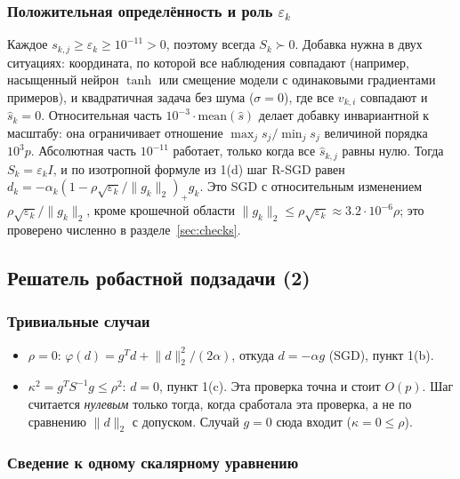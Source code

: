 \documentclass[11pt,a4paper]{article}
\newcommand{\norm}[1]{\lVert #1\rVert_2}
\begin{document}
\subsubsection*{Положительная определённость и роль $\varepsilon_k$}

Каждое $s_{k,j}\ge\varepsilon_k\ge10^{-11}>0$, поэтому всегда $S_k\succ0$. Добавка
нужна в двух ситуациях: координата, по которой все наблюдения совпадают (например,
насыщенный нейрон $\tanh$ или смещение модели с одинаковыми градиентами примеров), и
квадратичная задача без шума ($\sigma=0$), где все $v_{k,i}$ совпадают и
$\widehat s_k=0$. Относительная часть $10^{-3}\cdot\text{mean}(\widehat s)$ делает
добавку инвариантной к масштабу: она ограничивает отношение $\max_js_j/\min_js_j$
величиной порядка $10^3p$. Абсолютная часть $10^{-11}$ работает, только когда все
$\widehat s_{k,j}$ равны нулю. Тогда $S_k=\varepsilon_kI$, и по изотропной формуле из 1(d)
шаг R-SGD равен $d_k=-\alpha_k(1-\rho\sqrt{\varepsilon_k}/\norm{g_k})_+g_k$. Это SGD с
относительным изменением $\rho\sqrt{\varepsilon_k}/\norm{g_k}$, кроме крошечной
области $\norm{g_k}\le\rho\sqrt{\varepsilon_k}\approx3.2\cdot10^{-6}\rho$; это
проверено численно в разделе~\ref{sec:checks}.

\subsection{Решатель робастной подзадачи (2)}\label{sec:solver}

\subsubsection*{Тривиальные случаи}
\begin{itemize}
\item $\rho=0$: $\varphi(d)=g^Td+\norm d^2/(2\alpha)$, откуда $d=-\alpha g$ (SGD),
пункт 1(b).
\item $\kappa^2=g^TS^{-1}g\le\rho^2$: $d=0$, пункт 1(c). Эта проверка точна и стоит
$O(p)$. Шаг считается \emph{нулевым} только тогда, когда сработала эта проверка, а не
по сравнению $\norm d$ с допуском. Случай $g=0$ сюда входит ($\kappa=0\le\rho$).
\end{itemize}

\subsubsection*{Сведение к одному скалярному уравнению}
\end{document}
